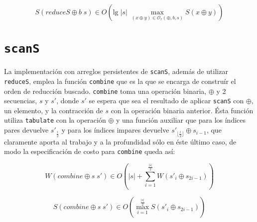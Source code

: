 \documentclass[a4paper,10pt]{article}
\begin{document}
\begin{equation*}
    S \left( reduceS \oplus b \; s \right) \in
    O \left( \text{lg} \; \vert s \vert \; \max_{(x \oplus y) \in \mathcal{O}_r(\oplus,b,s)} S \left( x \oplus y \right) \right)
\end{equation*}

\section*{\texttt{scanS}}

La implementación con arreglos persistentes de \texttt{scanS}, además de utilizar
\texttt{reduceS}, emplea la función \texttt{combine} que es la que se encarga de
construír el orden de reducción buscado.
\texttt{combine} toma una operación binaria, $\oplus$ y 2 secuencias, $s$ y $s'$,
donde $s'$ se espera que sea el resultado de aplicar \texttt{scanS} con $\oplus$,
un elemento, y la contracción de $s$ con la operación binaria anterior. Ésta función
utiliza \texttt{tabulate} con la operación $\oplus$ y una función auxiliar que
para los índices pares devuelve $s'_{\frac{i}{2}}$ y para los índices impares
devuelve $s'_{\lfloor \frac{i}{2} \rfloor} \oplus s_{i-1}$, que claramente
aporta al trabajo y a la profundidad sólo en éste último caso, de modo la especificación
de costo para \texttt{combine} queda así: 


\begin{equation*}
    W \left( combine \oplus s \; s' \right) \in
    O \left( \vert s \vert + \sum_{i=1}^{\frac{\vert s \vert}{2}} W \left( s'_{i} \oplus s_{2i-1} \right) \right)
\end{equation*}

\begin{equation*}
    S \left( combine \oplus s \; s' \right) \in
    O \left( \max_{i=1}^{\frac{\vert s \vert}{2}} S \left( s'_{i} \oplus s_{2i-1} \right) \right)
\end{equation*}
\end{document}
